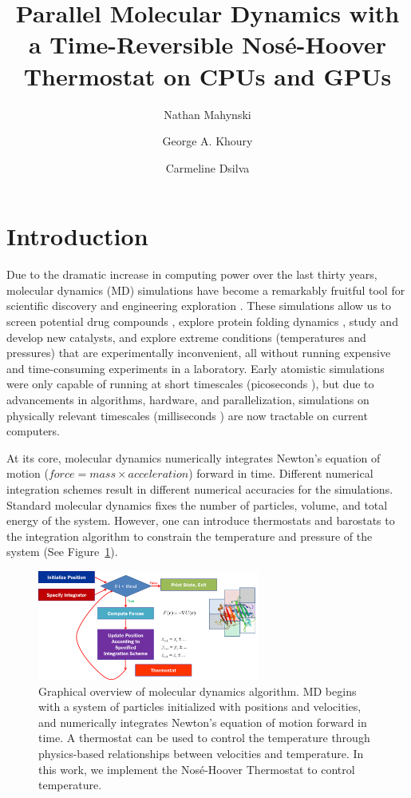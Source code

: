 \documentclass[12pt]{article}
\title{Parallel Molecular Dynamics with a Time-Reversible Nos\'{e}-Hoover Thermostat on CPUs and GPUs}
\author{Nathan Mahynski \and George A. Khoury \and Carmeline Dsilva}
\begin{document}
\maketitle

\section{Introduction}


Due to the dramatic increase in computing power over the last thirty years, molecular dynamics (MD) simulations have become a remarkably fruitful tool for scientific discovery and engineering exploration \cite{Karplus2002,Levitt2001}.
%
These simulations allow us to screen potential drug compounds \cite{Jorgensen2004}, explore protein folding dynamics \cite{Duan1998,Shaw2010,Piana2013,Lindorff-Larsen2011}, study \cite{Boero1998} and develop \cite{Zipoli2010} new catalysts, and explore extreme conditions (temperatures and pressures) that are experimentally inconvenient, all without running expensive and time-consuming experiments in a laboratory.
%
Early atomistic simulations were only capable of running at  short timescales (picoseconds \cite{Karplus1979}), but due to advancements in algorithms, hardware, and parallelization, simulations on physically relevant timescales (milliseconds \cite{Kohlhoff2014}) are now tractable on current computers.

At its core, molecular dynamics numerically integrates Newton's equation of motion ($force = mass \times acceleration$) forward in time.
%
Different numerical integration schemes result in different numerical accuracies for the simulations.
%
Standard molecular dynamics fixes the number of particles, volume, and total energy of the system.
%
However, one can introduce thermostats and barostats to the integration algorithm to constrain the temperature and pressure of the system (See Figure~\ref{fig:mdfigure}).

\begin{figure}
\centering
\includegraphics[width=0.65\textwidth]{mdfigure.png}
\caption{Graphical overview of molecular dynamics algorithm. MD begins with a system of particles initialized with positions and velocities, and numerically integrates Newton's equation of motion forward in time. A thermostat can be used to control the temperature through physics-based relationships between velocities and temperature. In this work, we implement the Nos\'{e}-Hoover Thermostat to control temperature.}
\label{fig:mdfigure}
\end{figure}
\end{document}
